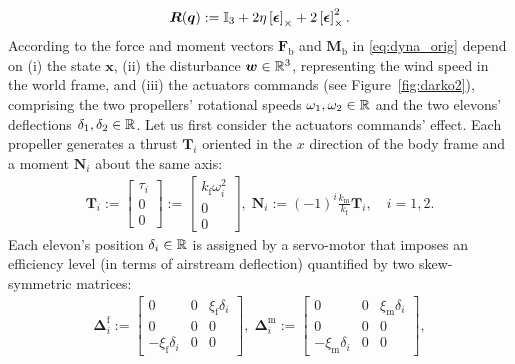 \begin{align}
    \label{eq:matrix_rot}
    \boldsymbol{R}(\boldsymbol{q}) := \mathbb{I}_{3} +2\eta \left[\boldsymbol{\epsilon}\right]_{\times} + 2\left[\boldsymbol{\epsilon}\right]_{\times}^{2}.
\end{align}
According to \cite{lustosa:hal-03035938} the force and moment vectors $\boldsymbol{F}_{\text{b}}$ and $\boldsymbol{M}_{\text{b}}$ in \eqref{eq:dyna_orig} depend on (i) the state $\boldsymbol{x}$, (ii) the disturbance $\boldsymbol{w} \in {\mathbb R}^3$, representing the wind speed in the world frame, and (iii) the actuators commands (see Figure~\ref{fig:darko2}), comprising the two propellers' rotational speeds
$\omega_1, \omega_2 \in {\mathbb R}$ and the two elevons' deflections $\delta_1, \delta_2\in {\mathbb R}$.
Let us first consider the actuators commands' effect. Each propeller generates a thrust $\boldsymbol{T}_i$ oriented in the $x$ direction of the body frame and a moment $\boldsymbol{N}_i$ about the same axis:
\begin{align}
\label{eq:thrust}
\boldsymbol{T}_{i} \!:=\! \begin{bmatrix} \tau_{i} \\ 0 \\ 0 \end{bmatrix} \!:=\!
\begin{bmatrix} k_{\text{f}}\omega_{i}^{2} \\ 0 \\ 0 \end{bmatrix}\! , \;
\boldsymbol{N}_{i} \!:=\! (-1)^{i}  \frac{k_{\text{m}} }{k_{\text{f}}}\boldsymbol{T}_{i}, \quad i=1,2 .
\end{align} 
Each elevon's position $\delta_i \in {\mathbb R}$ is assigned by a servo-motor that imposes an efficiency level (in terms of airstream deflection) quantified by two skew-symmetric matrices:
\begin{align}
\label{eq:elevons_efficiency}
    \boldsymbol{\Delta}^{\text{f}}_{i} \!:=\! \begin{bmatrix} 0 & 0 & \xi_{\text{f}}\delta_{i} \\ 0 & 0 & 0 \\ -\xi_{\text{f}}\delta_{i} & 0 & 0 \end{bmatrix}\! ,\;
    \boldsymbol{\Delta}^{\text{m}}_{i} \!:=\! \begin{bmatrix} 0 & 0 & \xi_{\text{m}}\delta_{i} \\ 0 & 0 & 0 \\ -\xi_{\text{m}}\delta_{i} & 0 & 0 \end{bmatrix} \!, 
\end{align}
